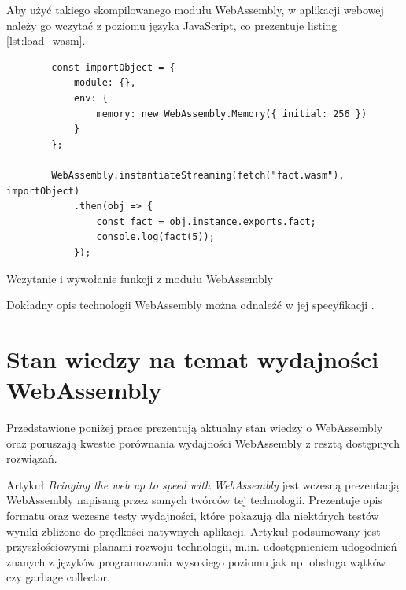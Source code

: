 \documentclass[language=polish,type=master]{aghmodern}
\begin{document}
Aby użyć takiego skompilowanego modułu WebAssembly, w aplikacji webowej należy go wczytać z poziomu języka JavaScript, co prezentuje listing \ref{lst:load_wasm}.

\begin{listing}[H]
    \begin{verbatim}
        const importObject = {
            module: {},
            env: {
                memory: new WebAssembly.Memory({ initial: 256 })
            }
        };

        WebAssembly.instantiateStreaming(fetch("fact.wasm"), importObject)
            .then(obj => {
                const fact = obj.instance.exports.fact;
                console.log(fact(5));
            });
    \end{verbatim}
    \caption{Wczytanie i wywołanie funkcji z modułu WebAssembly}
    \label{lst:load_wasm}
\end{listing}

Dokładny opis technologii WebAssembly można odnaleźć w jej specyfikacji \cite{wasm_specification}.

\section{Stan wiedzy na temat wydajności WebAssembly}
Przedstawione poniżej prace prezentują aktualny stan wiedzy o WebAssembly oraz poruszają kwestie porównania wydajności WebAssembly z resztą dostępnych rozwiązań.

Artykuł \cite{wasm} \emph{Bringing the web up to speed with WebAssembly} jest wczesną prezentacją WebAssembly napisaną przez samych twórców tej technologii.
Prezentuje opis formatu oraz wczesne testy wydajności, które pokazują dla niektórych testów wyniki zbliżone do prędkości natywnych aplikacji.
Artykuł podsumowany jest przyszłościowymi planami rozwoju technologii, m.in. udostępnieniem udogodnień znanych z języków programowania wysokiego poziomu jak np. obsługa wątków czy garbage collector\footnotemark{}.
\end{document}
